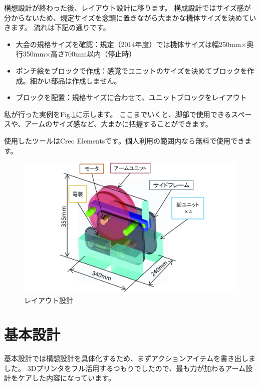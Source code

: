 構想設計が終わった後、レイアウト設計に移ります。
構成設計ではサイズ感が分からないため、規定サイズを念頭に置きながら大まかな機体サイズを決めていきます。
流れは下記の通りです。

\begin{itemize}
\tightlist
\item
  大会の規格サイズを確認：規定（2014年度）では機体サイズは幅250mm×奥行350mm×高さ700mm以内（停止時）
\item
  ポンチ絵をブロックで作成：感覚でユニットのサイズを決めてブロックを作成。細かい部品は作成しません。
\item
  ブロックを配置：規格サイズに合わせて、ユニットブロックをレイアウト
\end{itemize}

私が行った実例をFig.\ref{fig04}に示します。
ここまでいくと、脚部で使用できるスペースや、アームのサイズ感など、大まかに把握することができます。

使用したツールはCreo
Elements\cite{creo_elements}です。個人利用の範囲内なら無料で使用できます。

\begin{figure}[htbp]
\centering
\includegraphics[width=380pt]{fig/fig04_cmyk.jpg}
\caption{レイアウト設計}
\label{fig04}
\end{figure}

\section{基本設計}\label{ux57faux672cux8a2dux8a08}

基本設計では構想設計を具体化するため、まずアクションアイテムを書き出しました。
3Dプリンタをフル活用するつもりでしたので、最も力が加わるアーム設計をケアした内容になっています。

